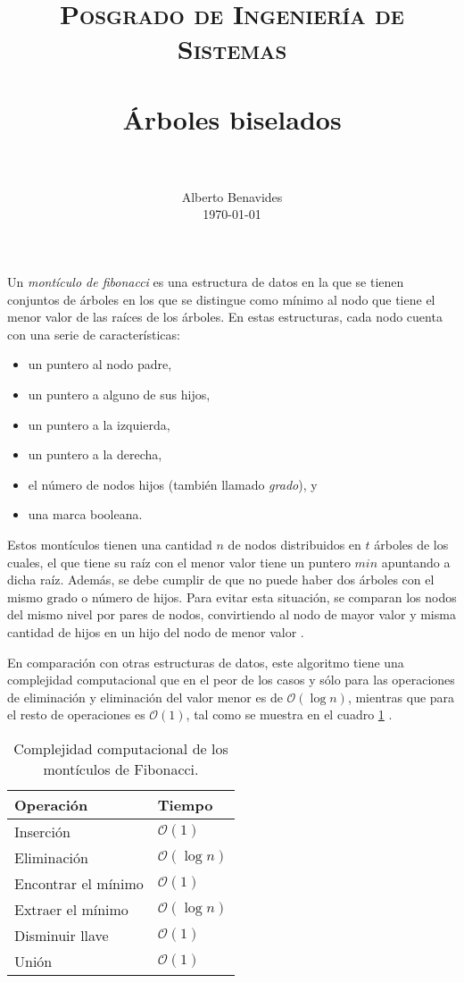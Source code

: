 \documentclass[paper=leter, fontsize=11pt]{scrartcl}
\title{
		\usefont{OT1}{bch}{b}{n}
		\normalfont \normalsize \textsc{Posgrado de Ingeniería de Sistemas} \\ [25pt]
		\horrule{0.5pt} \\[0.4cm]
		\huge Árboles biselados \\
		\horrule{2pt} \\[0.5cm]
}
\author{
		\normalfont 								\normalsize
        Alberto Benavides\\[-3pt]		\normalsize
        \today
}
\date{}
\numberwithin{equation}{section}		%
\numberwithin{figure}{section}			%
\numberwithin{table}{section}				%
\begin{document}
\maketitle

Un \textit{montículo de fibonacci} es una estructura de datos en la que se tienen conjuntos de árboles en los que se distingue como mínimo al nodo que tiene el menor valor de las raíces de los árboles. En estas estructuras, cada nodo cuenta con una serie de características:
\begin{itemize}
    \item un puntero al nodo padre,
    \item un puntero a alguno de sus hijos,
    \item un puntero a la izquierda,
    \item un puntero a la derecha,
    \item el número de nodos hijos (también llamado \textit{grado}), y
    \item una marca booleana.
\end{itemize}

Estos montículos tienen una cantidad $n$ de nodos distribuidos en $t$ árboles de los cuales, el que tiene su raíz con el menor valor tiene un puntero $\textit{min}$ apuntando a dicha raíz. Además, se debe cumplir de que no puede haber dos árboles con el mismo $\text{grado}$ o número de hijos. Para evitar esta situación, se comparan los nodos del mismo nivel por pares de nodos, convirtiendo al nodo de mayor valor y misma cantidad de hijos en un hijo del nodo de menor valor \cite{fibonacci_heap, aa}.

En comparación con otras estructuras de datos, este algoritmo tiene una complejidad computacional que en el peor de los casos y sólo para las operaciones de eliminación y eliminación del valor menor es de $\mathcal{O}(\log n)$, mientras que para el resto de operaciones es $\mathcal{O}(1)$, tal como se muestra en el cuadro \ref{complejidad} \cite{fibonacci_heap}.

\begin{table}[]
    \centering
    \caption{Complejidad computacional de los montículos de Fibonacci.}
    \label{complejidad}
    \begin{tabular}{ll}
    \textbf{Operación}    & \textbf{Tiempo}         \\ \hline
    Inserción       & $\mathcal{O}(1)$                 \\
    Eliminación       & $\mathcal{O}(\log n)$            \\
    Encontrar el mínimo     & $\mathcal{O}(1)$                 \\
    Extraer el mínimo  & $\mathcal{O}(\log n)$            \\
    Disminuir llave & $\mathcal{O}(1)$                 \\
    Unión        & $\mathcal{O}(1)$                       
    \end{tabular}
    \end{table}
\end{document}
